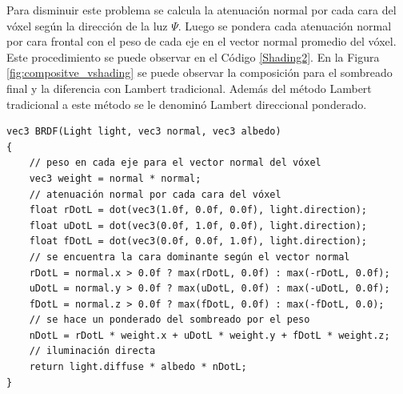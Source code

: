 \noindent Para disminuir este problema se calcula la atenuación normal por cada cara del vóxel según la dirección de la luz $\Psi$. Luego se pondera cada atenuación normal por cara frontal con el peso de cada eje en el vector normal promedio del vóxel. Este procedimiento se puede observar en el Código \ref{Shading2}. En la Figura \ref{fig:compositve_vshading} se puede observar la composición para el sombreado final y la diferencia con Lambert tradicional. Además del método Lambert tradicional a este método se le denominó Lambert direccional ponderado.
\\
\begin{lstlisting}[caption={Sombreado direccional y ponderado según el vector normal para un vóxel}, label=Shading2]
vec3 BRDF(Light light, vec3 normal, vec3 albedo)
{
    // peso en cada eje para el vector normal del vóxel
    vec3 weight = normal * normal;
    // atenuación normal por cada cara del vóxel
    float rDotL = dot(vec3(1.0f, 0.0f, 0.0f), light.direction);
    float uDotL = dot(vec3(0.0f, 1.0f, 0.0f), light.direction);
    float fDotL = dot(vec3(0.0f, 0.0f, 1.0f), light.direction);
    // se encuentra la cara dominante según el vector normal
    rDotL = normal.x > 0.0f ? max(rDotL, 0.0f) : max(-rDotL, 0.0f);
    uDotL = normal.y > 0.0f ? max(uDotL, 0.0f) : max(-uDotL, 0.0f);
    fDotL = normal.z > 0.0f ? max(fDotL, 0.0f) : max(-fDotL, 0.0);
    // se hace un ponderado del sombreado por el peso
    nDotL = rDotL * weight.x + uDotL * weight.y + fDotL * weight.z;
    // iluminación directa
    return light.diffuse * albedo * nDotL;
}
\end{lstlisting}

